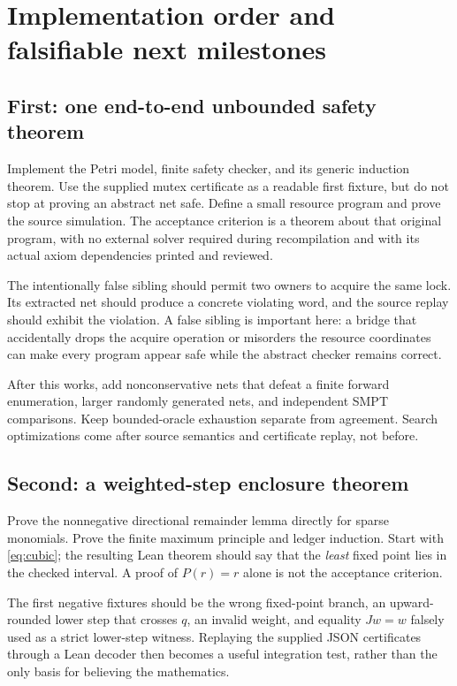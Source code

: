 \section{Implementation order and falsifiable next milestones}
\subsection{First: one end-to-end unbounded safety theorem}
Implement the Petri model, finite safety checker, and its generic induction theorem. Use the supplied mutex certificate as a readable first fixture, but do not stop at proving an abstract net safe. Define a small resource program and prove the source simulation. The acceptance criterion is a theorem about that original program, with no external solver required during recompilation and with its actual axiom dependencies printed and reviewed.

The intentionally false sibling should permit two owners to acquire the same lock. Its extracted net should produce a concrete violating word, and the source replay should exhibit the violation. A false sibling is important here: a bridge that accidentally drops the acquire operation or misorders the resource coordinates can make every program appear safe while the abstract checker remains correct.

After this works, add nonconservative nets that defeat a finite forward enumeration, larger randomly generated nets, and independent SMPT comparisons. Keep bounded-oracle exhaustion separate from agreement. Search optimizations come after source semantics and certificate replay, not before.

\subsection{Second: a weighted-step enclosure theorem}
Prove the nonnegative directional remainder lemma directly for sparse monomials. Prove the finite maximum principle and ledger induction. Start with \eqref{eq:cubic}; the resulting Lean theorem should say that the \emph{least} fixed point lies in the checked interval. A proof of $P(r)=r$ alone is not the acceptance criterion.

The first negative fixtures should be the wrong fixed-point branch, an upward-rounded lower step that crosses $q$, an invalid weight, and equality $Jw=w$ falsely used as a strict lower-step witness. Replaying the supplied JSON certificates through a Lean decoder then becomes a useful integration test, rather than the only basis for believing the mathematics.

